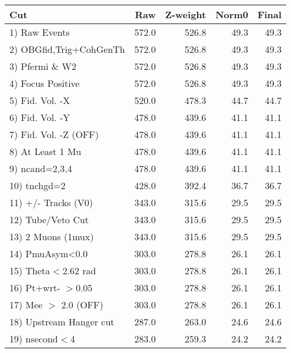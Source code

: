  \begin{table}[h!]\centering
 \begin{tabular}{||l||r|r|r|r||}
 \hline
 \hline
 Cut & Raw & Z-weight & Norm0 & Final \\
 \hline
  1) Raw Events           &       572.0 &       526.8 &        49.3 &        49.3 \\
  2) OBGfid,Trig+CohGenTh &       572.0 &       526.8 &        49.3 &        49.3 \\
  3) Pfermi \& W2         &       572.0 &       526.8 &        49.3 &        49.3 \\
  4) Focus Positive       &       572.0 &       526.8 &        49.3 &        49.3 \\
  5) Fid. Vol. -X         &       520.0 &       478.3 &        44.7 &        44.7 \\
  6) Fid. Vol. -Y         &       478.0 &       439.6 &        41.1 &        41.1 \\
  7) Fid. Vol. -Z (OFF)   &       478.0 &       439.6 &        41.1 &        41.1 \\
  8) At Least 1 Mu        &       478.0 &       439.6 &        41.1 &        41.1 \\
  9) ncand=2,3,4          &       478.0 &       439.6 &        41.1 &        41.1 \\
 10) tnchgd=2             &       428.0 &       392.4 &        36.7 &        36.7 \\
 11) +/- Tracks (V0)      &       343.0 &       315.6 &        29.5 &        29.5 \\
 12) Tube/Veto Cut        &       343.0 &       315.6 &        29.5 &        29.5 \\
 13) 2 Muons (1mux)       &       343.0 &       315.6 &        29.5 &        29.5 \\
 14) PmuAsym<0.0          &       303.0 &       278.8 &        26.1 &        26.1 \\
 15) Theta$<$2.62 rad     &       303.0 &       278.8 &        26.1 &        26.1 \\
 16) Pt+wrt- $>$0.05      &       303.0 &       278.8 &        26.1 &        26.1 \\
 17) Mee $>$ 2.0  (OFF)   &       303.0 &       278.8 &        26.1 &        26.1 \\
 18) Upstream Hanger cut  &       287.0 &       263.0 &        24.6 &        24.6 \\
 19) nsecond$<$4          &       283.0 &       259.3 &        24.2 &        24.2 \\

\end{tabular}
\end{table}
